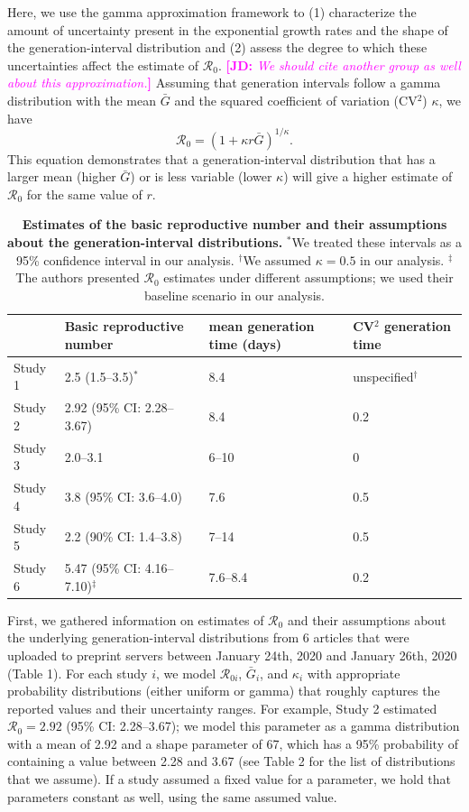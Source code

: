 \documentclass[12pt]{article}
\newcommand{\comment}[3]{\textcolor{#1}{\textbf{[#2: }\textsl{#3}\textbf{]}}}
\newcommand{\jd}[1]{\comment{magenta}{JD}{#1}}
\begin{document}
Here, we use the gamma approximation framework \citep{park2019practical} to (1) characterize the amount of uncertainty present in the exponential growth rates and the shape of the generation-interval distribution and (2) assess the degree to which these uncertainties affect the estimate of $\mathcal R_0$.
\jd{We should cite another group as well about this approximation.}
Assuming that generation intervals follow a gamma distribution
with the mean $\bar G$ and the squared coefficient of variation (CV$^2$) $\kappa$, 
we have
\begin{equation}
\mathcal R_0 = \left(1 + \kappa r \bar{G}\right)^{1/\kappa}.
\label{eq:gamma}
\end{equation}
This equation demonstrates that a generation-interval distribution
that has a larger mean (higher $\bar{G}$) or is less variable (lower $\kappa$)
will give a higher estimate of $\mathcal R_0$ for the same value of $r$.

\begin{table}[t]
\begin{center}
\footnotesize
\begin{tabular}{l|l|l|l}
 & Basic reproductive number & mean generation time (days) & CV$^2$ generation time \\
\hline
Study 1 & 2.5 (1.5--3.5)$^\ast$ & 8.4 & unspecified$^\dagger$ \\
\hline
Study 2 & 2.92 (95\% CI: 2.28--3.67) & 8.4 & 0.2 \\
\hline
Study 3 & 2.0--3.1 & 6--10 & 0 \\
\hline
Study 4 & 3.8 (95\% CI: 3.6--4.0) & 7.6 & 0.5 \\
\hline
Study 5 & 2.2 (90\% CI: 1.4--3.8) & 7--14 & 0.5\\
\hline
Study 6 & 5.47 (95\% CI: 4.16--7.10)$^\ddagger$ & 7.6--8.4 & 0.2
\end{tabular}
\end{center}
\caption{
\textbf{Estimates of the basic reproductive number and their assumptions about the generation-interval distributions.}
$^\ast$We treated these intervals as a 95\% confidence interval in our analysis.
$^\dagger$We assumed $\kappa = 0.5$ in our analysis.
$^\ddagger$The authors presented $\mathcal R_0$ estimates under different assumptions; we used their baseline scenario in our analysis.
}
\end{table}

First, we gathered information on estimates of $\mathcal R_0$ and their
assumptions about the underlying generation-interval distributions from
6 articles that were uploaded to
preprint servers between January 24th, 2020 and January 26th, 2020 (Table 1).
For each study $i$, we model $\mathcal R_{0i}$, $\bar G_i$, and $\kappa_i$ with appropriate probability distributions (either uniform or gamma) that roughly captures the reported values and their uncertainty ranges.
For example, Study 2 estimated $\mathcal R_0 = 2.92$ (95\% CI: 2.28--3.67);
we model this parameter as a gamma distribution with a mean of 2.92 and a shape parameter of 67, which has a 95\% probability of containing a value between 2.28 and 3.67 (see Table 2 for the list of distributions that we assume).
If a study assumed a fixed value for a parameter, we hold that parameters constant as well, using the same assumed value.
\end{document}
